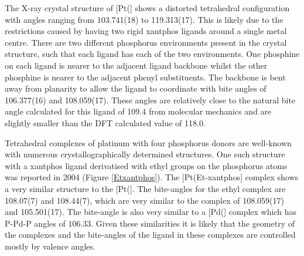 The X-ray crystal structure of [Pt(\Phthixantphos{}] shows a distorted tetrahedral configuration with angles ranging from 103.741(18) to 119.313(17)\degrees.  This is likely due to the restrictions caused by having two rigid xantphos ligands around a single metal centre.  There are two different phosphorus environments present in the crystal structure, such that each ligand has each of the two environments.  One phosphine on each ligand is nearer to the adjacent ligand backbone whilst the other phosphine is nearer to the adjacent phenyl substituents.  The backbone is bent away from planarity to allow the ligand to coordinate with bite angles of 106.377(16) and 108.059(17)\degrees. These angles are relatively close to the natural bite angle calculated for this ligand of 109.4\degrees{} from molecular mechanics and are slightly smaller than the DFT calculated value of 118.0\degrees.\cite{Birkholz2009}

Tetrahedral complexes of platinum with four phosphorus donors are well-known with numerous crystallographically determined structures.  One such structure with a xantphos ligand derivatised with ethyl groups on the phosphorus atoms was reported in 2004 (Figure \ref{Etxantphos}).\cite{Miedaner2004}  The [Pt(Et-xantphos] complex shows a very similar structure to the [Pt(\Phthixantphos{}].  The bite-angles for the ethyl complex are 108.07(7) and 108.44(7)\degrees, which are very similar to the \Phthixantphos{} complex of 108.059(17) and 105.501(17)\degrees.  The bite-angle is also very similar to a [Pd(\Phxantphos{}] complex which has P-Pd-P angles of 106.33\degrees.  Given these similarities it is likely that the geometry of the complexes and the bite-angles of the ligand in these complexes are controlled mostly by valence angles.  

